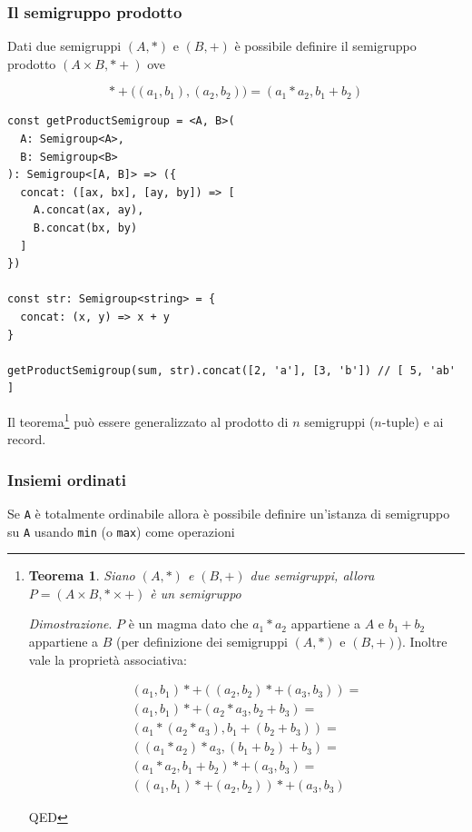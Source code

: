 \documentclass[12pt]{article}
\newtheorem{theorem}{Teorema}
\begin{document}
\subsubsection{Il semigruppo prodotto}

Dati due semigruppi $(A, *)$ e $(B, +)$ è possibile definire il semigruppo prodotto $(A \times B, *+)$ ove

$$
*+\Big((a_1, b_1), (a_2, b_2)\Big) = (a_1 * a_2, b_1 + b_2)
$$

\begin{verbatim}
const getProductSemigroup = <A, B>(
  A: Semigroup<A>,
  B: Semigroup<B>
): Semigroup<[A, B]> => ({
  concat: ([ax, bx], [ay, by]) => [
    A.concat(ax, ay),
    B.concat(bx, by)
  ]
})

const str: Semigroup<string> = {
  concat: (x, y) => x + y
}

getProductSemigroup(sum, str).concat([2, 'a'], [3, 'b']) // [ 5, 'ab' ]
\end{verbatim}

Il teorema\footnote{
\begin{theorem}
Siano $(A, *)$ e $(B, +)$ due semigruppi, allora $P = (A \times B, * \times +)$ è un semigruppo
\end{theorem}

\emph{Dimostrazione}. $P$ è un magma dato che $a_1 * a_2$ appartiene a $A$ e $b_1 + b_2$ appartiene a $B$ (per definizione dei semigruppi $(A, *)$ e $(B, +)$).
Inoltre vale la proprietà associativa:

\begin{eqnarray}
(a_1, b_1) *+ ((a_2, b_2) *+ (a_3, b_3)) = \\
(a_1, b_1) *+ (a_2 * a_3, b_2 + b_3) = \\
(a_1 * (a_2 * a_3), b_1 + (b_2 + b_3)) = \\
((a_1 * a_2) * a_3, (b_1 + b_2) + b_3) = \\
(a_1 * a_2, b_1 + b_2) *+ (a_3, b_3) = \\
((a_1, b_1) *+ (a_2, b_2)) *+ (a_3, b_3)
\end{eqnarray}

QED

} può essere generalizzato al prodotto di $n$ semigruppi ($n$-tuple) e ai record.

\subsubsection{Insiemi ordinati}

Se \texttt{A} è totalmente ordinabile allora è possibile definire un'istanza di semigruppo su \texttt{A} usando \texttt{min} (o \texttt{max}) come operazioni
\end{document}
